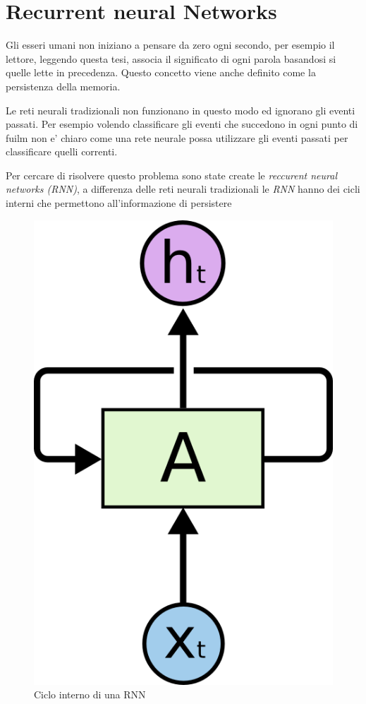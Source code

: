 \documentclass[a4paper,12pt,openright,twoside]{report}
\theoremstyle{definition}
\begin{document}
\section{Recurrent neural Networks}
Gli esseri umani non iniziano a pensare da zero ogni secondo, per esempio il lettore, leggendo questa tesi,
associa il significato di ogni parola basandosi si quelle lette in precedenza. Questo concetto viene anche 
definito come la persistenza della memoria.

Le reti neurali tradizionali non funzionano in questo modo ed ignorano gli eventi passati. Per esempio 
volendo classificare gli eventi che succedono in ogni punto di fuilm non e' chiaro come una rete neurale
possa utilizzare gli eventi passati per classificare quelli correnti.

Per cercare di risolvere questo problema sono state create le \emph{reccurent neural networks (RNN)},
a differenza delle reti neurali tradizionali le \emph{RNN} hanno dei cicli interni che permettono
all'informazione di persistere 

\begin{figure}[h]
	\centering
	\includegraphics[scale=0.5]{Immagini/rnn1.png}
	\caption{Ciclo interno di una RNN}
	\label{fig:rnn1}
\end{figure}
\end{document}
